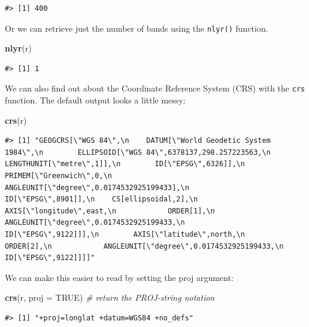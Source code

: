 \documentclass[
]{book}
\newenvironment{Shaded}{\begin{snugshade}}{\end{snugshade}}
\newcommand{\AttributeTok}[1]{\textcolor[rgb]{0.13,0.29,0.53}{#1}}
\newcommand{\CommentTok}[1]{\textcolor[rgb]{0.56,0.35,0.01}{\textit{#1}}}
\newcommand{\ConstantTok}[1]{\textcolor[rgb]{0.56,0.35,0.01}{#1}}
\newcommand{\FunctionTok}[1]{\textcolor[rgb]{0.13,0.29,0.53}{\textbf{#1}}}
\newcommand{\NormalTok}[1]{#1}
\begin{document}
\begin{verbatim}
#> [1] 400
\end{verbatim}

Or we can retrieve just the number of bands using the \texttt{nlyr()} function.

\begin{Shaded}
\begin{Highlighting}[]
\FunctionTok{nlyr}\NormalTok{(r)}
\end{Highlighting}
\end{Shaded}

\begin{verbatim}
#> [1] 1
\end{verbatim}

We can also find out about the Coordinate Reference System (CRS) with the \texttt{crs} function. The default output looks a little messy:

\begin{Shaded}
\begin{Highlighting}[]
\FunctionTok{crs}\NormalTok{(r)}
\end{Highlighting}
\end{Shaded}

\begin{verbatim}
#> [1] "GEOGCRS[\"WGS 84\",\n    DATUM[\"World Geodetic System 1984\",\n        ELLIPSOID[\"WGS 84\",6378137,298.257223563,\n            LENGTHUNIT[\"metre\",1]],\n        ID[\"EPSG\",6326]],\n    PRIMEM[\"Greenwich\",0,\n        ANGLEUNIT[\"degree\",0.0174532925199433],\n        ID[\"EPSG\",8901]],\n    CS[ellipsoidal,2],\n        AXIS[\"longitude\",east,\n            ORDER[1],\n            ANGLEUNIT[\"degree\",0.0174532925199433,\n                ID[\"EPSG\",9122]]],\n        AXIS[\"latitude\",north,\n            ORDER[2],\n            ANGLEUNIT[\"degree\",0.0174532925199433,\n                ID[\"EPSG\",9122]]]]"
\end{verbatim}

We can make this easier to read by setting the proj argument:

\begin{Shaded}
\begin{Highlighting}[]
\FunctionTok{crs}\NormalTok{(r, }\AttributeTok{proj =} \ConstantTok{TRUE}\NormalTok{) }\CommentTok{\# return the PROJ{-}string notation}
\end{Highlighting}
\end{Shaded}

\begin{verbatim}
#> [1] "+proj=longlat +datum=WGS84 +no_defs"
\end{verbatim}
\end{document}
